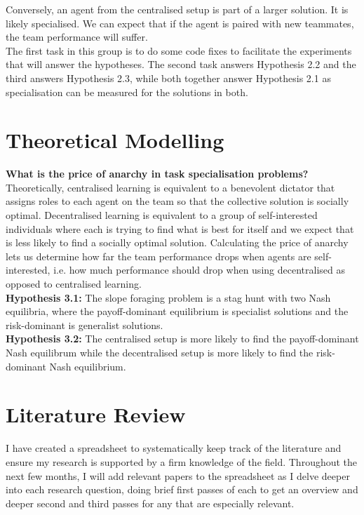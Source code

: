 \documentclass[12pt]{article}
\begin{document}
Conversely, an agent from the centralised setup is part of a larger solution. It is likely specialised. We can expect that if the agent is paired with new teammates, the team performance will suffer. \\

The first task in this group is to do some code fixes to facilitate the experiments that will answer the hypotheses.
The second task answers Hypothesis 2.2 and the third answers Hypothesis 2.3, while both together answer Hypothesis 2.1 as specialisation can be measured for the solutions in both.


\section{Theoretical Modelling}\label{theoretical_model}

\textbf{What is the price of anarchy in task specialisation problems?}\\

Theoretically, centralised learning is equivalent to a benevolent dictator that assigns roles to each agent on the team so that the collective solution is socially optimal. 
Decentralised learning is equivalent to a group of self-interested individuals where each is trying to find what is best for itself and we expect that is less likely to find a socially optimal solution. 
Calculating the price of anarchy lets us determine how far the team performance drops when agents are self-interested, i.e. how much performance should drop when using decentralised as opposed to centralised learning.\\

\textbf{Hypothesis 3.1:} The slope foraging problem is a stag hunt with two Nash equilibria, where the payoff-dominant equilibrium is specialist solutions and the risk-dominant is generalist solutions.\\

\textbf{Hypothesis 3.2:} The centralised setup is more likely to find the payoff-dominant Nash equilibrum while the decentralised setup is more likely to find the risk-dominant Nash equilibrium.\\

\section{Literature Review}\label{literature}

I have created a spreadsheet to systematically keep track of the literature and ensure my research is supported by a firm knowledge of the field. 
Throughout the next few months, I will add relevant papers to the spreadsheet as I delve deeper into each research question, doing brief first passes of each to get an overview and deeper second and third passes for any that are especially relevant.
\end{document}
